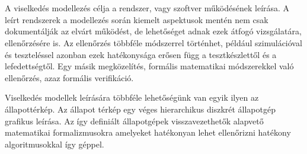 \chapter{\bevezetes}

A viselkedés modellezés célja a rendszer, vagy szoftver működésének leírása. A leírt rendszerek a modellezés során kiemelt aspektusok mentén nem csak dokumentálják az elvárt működést, de lehetőséget adnak ezek átfogó vizsgálatára, ellenőrzésére is. Az ellenőrzés többféle módszerrel történhet, például szimulációval és teszteléssel azonban ezek hatékonysága erősen függ a tesztkészlettől és a lefedettségtől. Egy másik megközelítés, formális matematikai módszerekkel való ellenőrzés, azaz formális verifikáció.

Viselkedés modellek leírására többféle lehetőségünk van egyik ilyen az állapottérkép. Az állapot térkép egy véges hierarchikus diszkrét állapotgép grafikus leírása. Az így definiált állapotgépek visszavezethetők alapvető matematikai formalizmusokra amelyeket hatékonyan lehet ellenőrizni hatékony algoritmusokkal így géppel.


